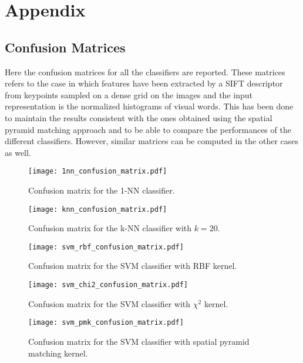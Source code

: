 \documentclass[../main.tex]{subfiles}
\begin{document}
\section{Appendix}\label{appendix}

\subsection{Confusion Matrices}\label{app:confusion-matrices}

Here the confusion matrices for all the classifiers are reported. These matrices refers to the case in which features have been extracted by a SIFT descriptor from keypoints sampled on a dense grid on the images and the input representation is the normalized histograms of visual words. This has been done to maintain the results consistent with the ones obtained using the spatial pyramid matching approach and to be able to compare the performances of the different classifiers. However, similar matrices can be computed in the other cases as well.\\

\begin{figure}[htb]
  \centering
  \texttt{[image: 1nn\_confusion\_matrix.pdf]}
  \caption{Confusion matrix for the 1-NN classifier.}\label{fig:confusion-matrix-1nn}
\end{figure}

\begin{figure}[htb]
  \centering
  \texttt{[image: knn\_confusion\_matrix.pdf]}
  \caption{Confusion matrix for the k-NN classifier with $k = 20$.}\label{fig:confusion-matrix-knn}
\end{figure}

\begin{figure}[htb]
  \centering
  \texttt{[image: svm\_rbf\_confusion\_matrix.pdf]}
  \caption{Confusion matrix for the SVM classifier with RBF kernel.}\label{fig:confusion-matrix-rbf}
\end{figure}

\begin{figure}[htb]
  \centering
  \texttt{[image: svm\_chi2\_confusion\_matrix.pdf]}
  \caption{Confusion matrix for the SVM classifier with $\chi^2$ kernel.}\label{fig:confusion-matrix-chi2}
\end{figure}

\begin{figure}[htb]
  \centering
  \texttt{[image: svm\_pmk\_confusion\_matrix.pdf]}
  \caption{Confusion matrix for the SVM classifier with spatial pyramid matching kernel.}\label{fig:confusion-matrix-pmk}
\end{figure}
\end{document}
